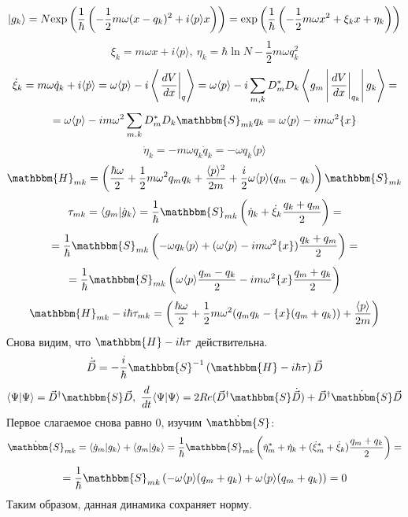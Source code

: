 $$|g_k\rangle=%
  N\myexp{\frac{1}{\hbar}\left(-\frac{1}{2}m\omega(x-q_k)^2+i\langle p\rangle x\right)}=%
  \myexp{\frac{1}{\hbar}\left(-\frac{1}{2}m\omega x^2 + \xi_k x + \eta_k\right)}$$
$$\xi_k = m\omega x + i\langle p\rangle,\ \eta_k = \hbar\ln N - \frac{1}{2}m\omega q_k^2$$
$$\dot{\xi}_k=m\omega\dot{q}_k+i\langle\dot{p}\rangle = %
              \omega\langle p\rangle - i \left\langle\left.\frac{dV}{dx}\right|_q\right\rangle=%
	      \omega\langle p\rangle - i\sum_{m,k}D_m^*D_k\mymean{g_m}{\left.\frac{dV}{dx}\right|_{q_k}}{g_k}=$$
$$=\omega\langle p\rangle - im\omega^2\sum_{m.k}D_m^*D_k\mathbbm{S}_{mk}q_k = %
   \omega\langle p\rangle - im\omega^2 \{x\}$$
$$\dot{\eta}_k = -m\omega q_k\dot{q}_k = -\omega q_k\langle p\rangle$$
$$\mathbbm{H}_{mk} = \left(\frac{\hbar\omega}{2} + %
			   \frac{1}{2}m\omega^2q_mq_k + %
			   \frac{\langle p\rangle^2}{2m} + %
			   \frac{i}{2}\omega\langle p\rangle(q_m-q_k)\right)\mathbbm{S}_{mk}$$
$$\tau_{mk}=\myint{g_m}{\dot{g}_k} = %
	    \frac{1}{\hbar}\mathbbm{S}_{mk}\left(\dot{\eta}_k+%
						 \dot{\xi}_k\frac{q_k+q_m}{2}\right) = $$
$$=\frac{1}{\hbar}\mathbbm{S}_{mk}\left(-\omega q_k\langle p\rangle + %
                          (\omega\langle p\rangle-im\omega^2\{x\})\frac{q_k+q_m}{2}\right) = $$
$$=\frac{1}{\hbar}\mathbbm{S}_{mk}\left(\omega\langle p\rangle\frac{q_m-q_k}{2} - %
			 im\omega^2\{x\}\frac{q_m+q_k}{2}\right)$$
$$\mathbbm{H}_{mk}-i\hbar\tau_{mk} = %
  \left(\frac{\hbar\omega}{2} + %
	\frac{1}{2}m\omega^2(q_mq_k-\{x\}(q_m+q_k)) + %
	\frac{\langle p\rangle}{2m}\right)$$
Снова видим, что $\mathbbm{H}-i\hbar\tau$ действительна. 
$$\dot{\vec{D}} = -\frac{i}{\hbar}\mathbbm{S}^{-1}\left(\mathbbm{H}-i\hbar\tau\right)\vec{D}$$
$$\myint{\Psi}{\Psi} = \vec{D}^{\dagger}\mathbbm{S}\vec{D},\ %
  \frac{d}{dt}\myint{\Psi}{\Psi} = 2Re(\vec{D}^{\dagger}\mathbbm{S}\dot{\vec{D}})+%
				   \vec{D}^{\dagger}\dot{\mathbbm{S}}\vec{D}$$
Первое слагаемое снова равно $0$, изучим $\dot{\mathbbm{S}}$:
$$\dot{\mathbbm{S}}_{mk} = \myint{\dot{g}_m}{g_k}+\myint{g_m}{\dot{g}_k} = %
  \frac{1}{\hbar}\mathbbm{S}_{mk}\left(\dot{\eta}_m^*+\dot{\eta}_k+%
					(\dot{\xi}_m^*+\dot{\xi}_k)\frac{q_m+q_k}{2}\right)=$$
$$= \frac{1}{\hbar}\mathbbm{S}_{mk}\left(-\omega\langle p\rangle(q_m+q_k) + %
					  \omega\langle p\rangle(q_m+q_k)\right) = 0$$
Таким образом, данная динамика сохраняет норму.

